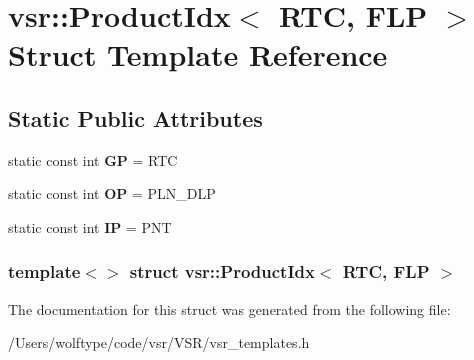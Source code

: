 \hypertarget{structvsr_1_1_product_idx_3_01_r_t_c_00_01_f_l_p_01_4}{\section{vsr\-:\-:Product\-Idx$<$ R\-T\-C, F\-L\-P $>$ Struct Template Reference}
\label{structvsr_1_1_product_idx_3_01_r_t_c_00_01_f_l_p_01_4}
}
\subsection*{Static Public Attributes}
\begin{DoxyCompactItemize}
\item 
\hypertarget{structvsr_1_1_product_idx_3_01_r_t_c_00_01_f_l_p_01_4_a2a9e98cfebd55be1b3f5dc9b72f40463}{static const int {\bfseries G\-P} = R\-T\-C}\label{structvsr_1_1_product_idx_3_01_r_t_c_00_01_f_l_p_01_4_a2a9e98cfebd55be1b3f5dc9b72f40463}

\item 
\hypertarget{structvsr_1_1_product_idx_3_01_r_t_c_00_01_f_l_p_01_4_ae77a51e9eeb688f6ee4ac13941245976}{static const int {\bfseries O\-P} = P\-L\-N\-\_\-\-D\-L\-P}\label{structvsr_1_1_product_idx_3_01_r_t_c_00_01_f_l_p_01_4_ae77a51e9eeb688f6ee4ac13941245976}

\item 
\hypertarget{structvsr_1_1_product_idx_3_01_r_t_c_00_01_f_l_p_01_4_a5ee0a803576ba0fb8d8af588cb1d0c37}{static const int {\bfseries I\-P} = P\-N\-T}\label{structvsr_1_1_product_idx_3_01_r_t_c_00_01_f_l_p_01_4_a5ee0a803576ba0fb8d8af588cb1d0c37}

\end{DoxyCompactItemize}
\subsubsection*{template$<$$>$ struct vsr\-::\-Product\-Idx$<$ R\-T\-C, F\-L\-P $>$}



The documentation for this struct was generated from the following file\-:\begin{DoxyCompactItemize}
\item 
/\-Users/wolftype/code/vsr/\-V\-S\-R/vsr\-\_\-templates.\-h\end{DoxyCompactItemize}
